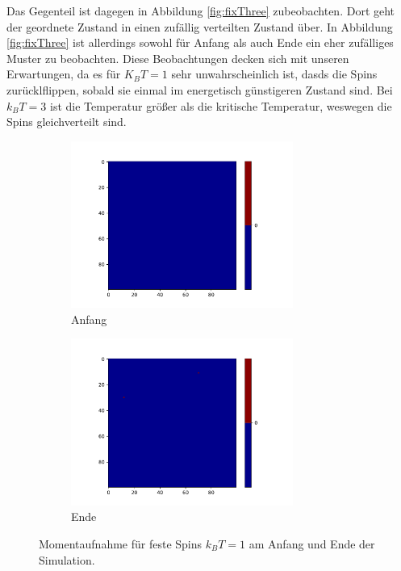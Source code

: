 Das Gegenteil ist dagegen in Abbildung \ref{fig:fixThree} zubeobachten. Dort geht der geordnete Zustand in einen zufällig verteilten Zustand über. In Abbildung \ref{fig:fixThree} ist allerdings sowohl für Anfang als auch Ende ein eher zufälliges Muster zu beobachten.
Diese Beobachtungen decken sich mit unseren Erwartungen, da es für $K_B T = 1$ sehr unwahrscheinlich ist, dasds die Spins zurücklflippen, sobald sie einmal im energetisch günstigeren Zustand sind. Bei $k_B T = 3$ ist die Temperatur größer als die kritische Temperatur, weswegen die Spins gleichverteilt sind.  
\begin{figure}
  \begin{subfigure}{0.48\textwidth}
    \includegraphics[width = 0.8\textwidth]{A2/build/1kbt-a-fest_anfang.pdf}
    \caption{Anfang}
  \end{subfigure}
  \begin{subfigure}{0.48\textwidth}
    \includegraphics[width = 0.8\textwidth]{A2/build/1kbt-a-fest_ende.pdf}
    \caption{Ende}
  \end{subfigure}
  \caption{Momentaufnahme für feste Spins $k_B T =1$ am Anfang und Ende der Simulation. }
  \label{fig:fixOne}
\end{figure}


